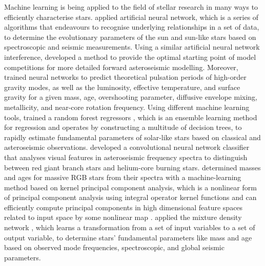 Machine learning is being applied to the field of stellar research in many ways to efficiently characterise stars.
\citet{2016MNRAS.461.4206V} applied artificial neural network, which is a series of algorithms that endeavours to recognise underlying relationships in a set of data, to determine the evolutionary parameters of the sun and sun-like stars based on spectroscopic and seismic measurements. Using a similar artificial neural network interference, \citet{2019PASP..131j8001H} developed a method to provide the optimal starting point of model competitions for more detailed forward asteroseismic modelling. Moreover, \citet{2021arXiv210313394M} trained neural networks to predict theoretical pulsation periods of high-order gravity modes, as well as the luminosity, effective temperature, and surface gravity for a given mass, age, overshooting parameter, diffusive envelope mixing, metallicity, and near-core rotation frequency. 
%
Using different machine learning tools, \citet{2016ApJ...830...31B} trained a random forest regressors \citep{ho1995random}, which is an ensemble learning method for regression and operates by constructing a multitude of decision trees, to rapidly estimate fundamental parameters of solar-like stars based on classical and asteroseismic observations. \citet{2018MNRAS.476.3233H} developed a convolutional neural network classifier that analyses visual features in asteroseismic frequency spectra to distinguish between red giant branch stars and helium-core burning stars. \citet{2019MNRAS.484.5315W} determined masses and ages for massive RGB stars from their spectra with a machine-learning method based on kernel principal component analysis, which is a nonlinear form of principal component analysis using integral operator kernel functions and can efficiently compute principal components in high dimensional feature spaces related to input space by some nonlinear map \citep{scholkopf1997kernel}. \citet{2020MNRAS.499.2445H} applied the mixture density network \citep{bishop1994mixture}, which learns a transformation from a set of input variables to a set of output variable, to determine stars' fundamental parameters like mass and age based on observed mode frequencies, spectroscopic, and global seismic parameters.


